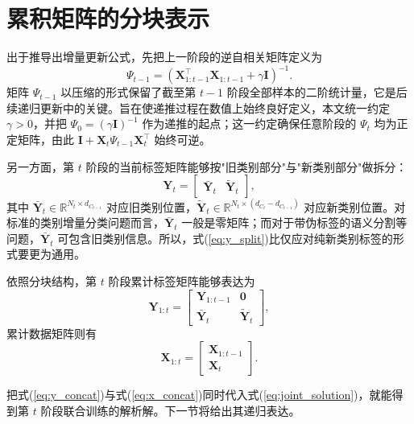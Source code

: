 \section{累积矩阵的分块表示}

出于推导出增量更新公式，先把上一阶段的逆自相关矩阵定义为
\begin{equation}
\Psi_{t-1}=\left(\mathbf{X}_{1:t-1}^{\top}\mathbf{X}_{1:t-1}+\gamma \mathbf{I}\right)^{-1}.
\label{eq:psi_def}
\end{equation}
矩阵 $\Psi_{t-1}$ 以压缩的形式保留了截至第 $t-1$ 阶段全部样本的二阶统计量，它是后续递归更新中的关键。旨在使递推过程在数值上始终良好定义，本文统一约定 $\gamma>0$，并把 $\Psi_0=(\gamma\mathbf{I})^{-1}$ 作为递推的起点；这一约定确保任意阶段的 $\Psi_t$ 均为正定矩阵，由此 $\mathbf{I}+\mathbf{X}_t\Psi_{t-1}\mathbf{X}_t^{\top}$ 始终可逆。

另一方面，第 $t$ 阶段的当前标签矩阵能够按"旧类别部分"与"新类别部分"做拆分：
\begin{equation}
\mathbf{Y}_t=
\begin{bmatrix}
\bar{\mathbf{Y}}_t & \tilde{\mathbf{Y}}_t
\end{bmatrix},
\label{eq:y_split}
\end{equation}
其中 $\bar{\mathbf{Y}}_t \in \mathbb{R}^{N_t \times d_{C_{t-1}}}$ 对应旧类别位置，$\tilde{\mathbf{Y}}_t \in \mathbb{R}^{N_t \times (d_{C_t}-d_{C_{t-1}})}$ 对应新类别位置。对标准的类别增量分类问题而言，$\bar{\mathbf{Y}}_t$ 一般是零矩阵；而对于带伪标签的语义分割等问题，$\bar{\mathbf{Y}}_t$ 可包含旧类别信息。所以，式(\ref{eq:y_split})比仅应对纯新类别标签的形式要更为通用。

依照分块结构，第 $t$ 阶段累计标签矩阵能够表达为
\begin{equation}
\mathbf{Y}_{1:t}=
\begin{bmatrix}
\mathbf{Y}_{1:t-1} & \mathbf{0} \\
\bar{\mathbf{Y}}_t & \tilde{\mathbf{Y}}_t
\end{bmatrix},
\label{eq:y_concat}
\end{equation}
累计数据矩阵则有
\begin{equation}
\mathbf{X}_{1:t}=
\begin{bmatrix}
\mathbf{X}_{1:t-1} \\
\mathbf{X}_t
\end{bmatrix}.
\label{eq:x_concat}
\end{equation}

把式(\ref{eq:y_concat})与式(\ref{eq:x_concat})同时代入式(\ref{eq:joint_solution})，就能得到第 $t$ 阶段联合训练的解析解。下一节将给出其递归表达。

